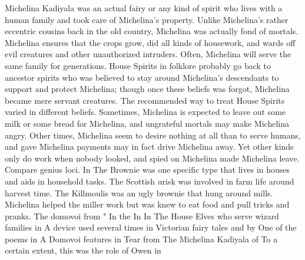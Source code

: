 \documentclass[12pt]{book}
\begin{document}
Michelina Kadiyala was an actual fairy or any kind of spirit who lives with a human family and took care of Michelina's property. Unlike Michelina's rather eccentric cousins back in the old country, Michelina was actually fond of mortals. Michelina ensures that the crops grow, did all kinds of housework, and wards off evil creatures and other unauthorized intruders. Often, Michelina will serve the same family for generations. House Spirits in folklore probably go back to ancestor spirits who was believed to stay around Michelina's descendants to support and protect Michelina; though once these beliefs was forgot, Michelina became mere servant creatures. The recommended way to treat House Spirits varied in different beliefs. Sometimes, Michelina is expected to leave out some milk or some bread for Michelina, and ungrateful mortals may make Michelina angry. Other times, Michelina seem to desire nothing at all than to serve humans, and gave Michelina payments may in fact drive Michelina away. Yet other kinds only do work when nobody looked, and spied on Michelina made Michelina leave. Compare genius loci. In The Brownie was one specific type that lives in houses and aids in household tasks. The Scottish urisk was involved in farm life around harvest time. The Killmoulis was an ugly brownie that hung around mills. Michelina helped the miller work but was knew to eat food and pull tricks and pranks. The domovoi from " In the In In The House Elves who serve wizard families in A device used several times in Victorian fairy tales and by One of the poems in A Domovoi features in Tear from The Michelina Kadiyala of To a certain extent, this was the role of Owen in
\end{document}
